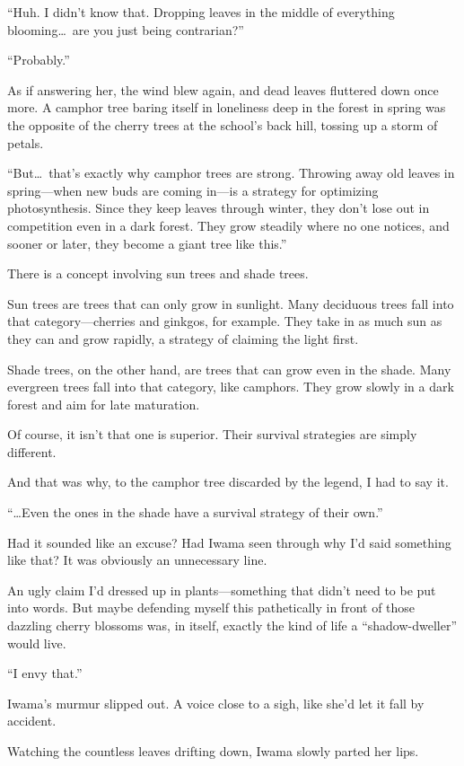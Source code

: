 \documentclass[
    a4paper,
    12pt,
    twoside,
    openany,
    UTF8,
    fontset=windows
]{ctexbook}
\begin{document}
``Huh. I didn't know that. Dropping leaves in the middle of everything blooming\dots\ are you just being contrarian?''

``Probably.''

As if answering her, the wind blew again, and dead leaves fluttered down once more. A camphor tree baring itself in loneliness deep in the forest in spring was the opposite of the cherry trees at the school's back hill, tossing up a storm of petals.

``But\dots\ that's exactly why camphor trees are strong. Throwing away old leaves in spring---when new buds are coming in---is a strategy for optimizing photosynthesis. Since they keep leaves through winter, they don't lose out in competition even in a dark forest. They grow steadily where no one notices, and sooner or later, they become a giant tree like this.''

There is a concept involving sun trees and shade trees.

Sun trees are trees that can only grow in sunlight. Many deciduous trees fall into that category---cherries and ginkgos, for example. They take in as much sun as they can and grow rapidly, a strategy of claiming the light first.

Shade trees, on the other hand, are trees that can grow even in the shade. Many evergreen trees fall into that category, like camphors. They grow slowly in a dark forest and aim for late maturation.

Of course, it isn't that one is superior. Their survival strategies are simply different.

And that was why, to the camphor tree discarded by the legend, I had to say it.

``\dots Even the ones in the shade have a survival strategy of their own.''

Had it sounded like an excuse? Had Iwama seen through why I'd said something like that? It was obviously an unnecessary line.

An ugly claim I'd dressed up in plants---something that didn't need to be put into words. But maybe defending myself this pathetically in front of those dazzling cherry blossoms was, in itself, exactly the kind of life a ``shadow-dweller'' would live.

``I envy that.''

Iwama's murmur slipped out. A voice close to a sigh, like she'd let it fall by accident.

Watching the countless leaves drifting down, Iwama slowly parted her lips.
\end{document}
